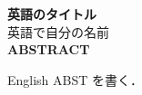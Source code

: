 \begin{center}
{\LARGE \bf 英語のタイトル}
\\[0.5cm]
{\Large 英語で自分の名前}
\\[1.0cm]
{\LARGE \bf ABSTRACT}
\end{center}


\indent

English ABST を書く．
